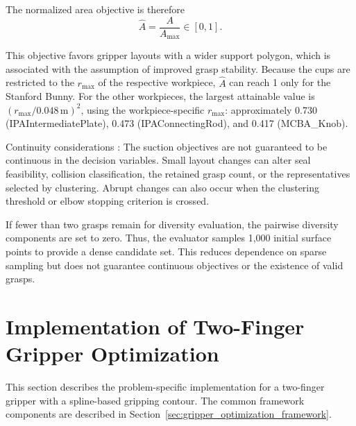     The normalized area objective is therefore
    \begin{equation}
        \hat{A} = \frac{A}{A_{\max}} \in [0,1].
    \end{equation}

    This objective favors gripper layouts with a wider support polygon, which is associated with
    the assumption of improved grasp stability. Because the cups are restricted to the $r_{\max}$ of the
    respective workpiece, $\hat{A}$ can reach 1 only for the Stanford Bunny. For the
    other workpieces, the largest attainable value is
    $(r_{\max}/0.048\,\mathrm{m})^{2}$, using the workpiece-specific $r_{\max}$:
    approximately 0.730 (IPAIntermediatePlate), 0.473 (IPAConnectingRod), and
    0.417 (MCBA\_Knob).


Continuity considerations : The suction objectives are not guaranteed to be continuous in the
decision variables. Small layout changes can alter seal feasibility,
collision classification, the retained grasp count, or the
representatives selected by clustering. Abrupt changes can also occur
when the clustering threshold or elbow stopping criterion is crossed.

If fewer than two grasps remain for diversity evaluation, the pairwise
diversity components are set to zero. Thus, the evaluator samples
1,000 initial surface points to provide a dense candidate set. This reduces
dependence on sparse sampling but does not guarantee continuous
objectives or the existence of valid grasps.


\section{Implementation of Two-Finger Gripper Optimization}
\label{sec:two_finger_gripper_optimization}

This section describes the problem-specific implementation for a two-finger gripper with a
spline-based gripping contour. The common framework components are described in
Section~\ref{sec:gripper_optimization_framework}.

